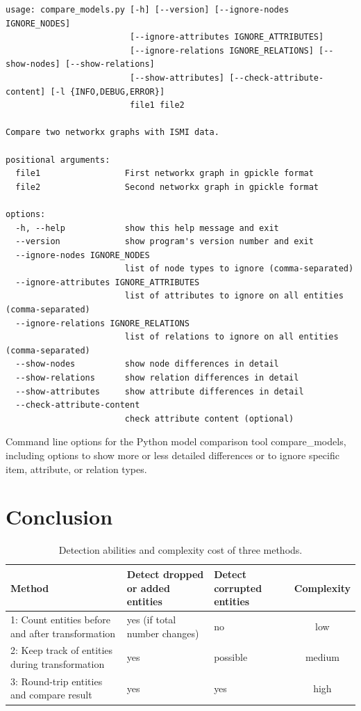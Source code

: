 \documentclass[final]{anthology-ch} %
\begin{document}
\begin{listing}
\begin{verbatim}
usage: compare_models.py [-h] [--version] [--ignore-nodes IGNORE_NODES]
                         [--ignore-attributes IGNORE_ATTRIBUTES]
                         [--ignore-relations IGNORE_RELATIONS] [--show-nodes] [--show-relations]
                         [--show-attributes] [--check-attribute-content] [-l {INFO,DEBUG,ERROR}]
                         file1 file2

Compare two networkx graphs with ISMI data.

positional arguments:
  file1                 First networkx graph in gpickle format
  file2                 Second networkx graph in gpickle format

options:
  -h, --help            show this help message and exit
  --version             show program's version number and exit
  --ignore-nodes IGNORE_NODES
                        list of node types to ignore (comma-separated)
  --ignore-attributes IGNORE_ATTRIBUTES
                        list of attributes to ignore on all entities (comma-separated)
  --ignore-relations IGNORE_RELATIONS
                        list of relations to ignore on all entities (comma-separated)
  --show-nodes          show node differences in detail
  --show-relations      show relation differences in detail
  --show-attributes     show attribute differences in detail
  --check-attribute-content
                        check attribute content (optional)
\end{verbatim}
  \caption{Command line options for the Python model comparison tool compare\_models, including options to show more or less detailed differences or to ignore specific item, attribute, or relation types.}
  \label{code:ismi-compare}
\end{listing}


\section{Conclusion}

\begin{table}[h]
  \centering
  \begin{tabular}{>{\raggedright}p{} >{\centering}p{} >{\centering}p{} c}
    Method & Detect dropped or added entities & Detect corrupted entities & Complexity \\ \midrule
    1: Count entities before and after transformation & yes (if total number changes) & no & low \\ \midrule
    2: Keep track of entities during transformation & yes & possible & medium \\ \midrule
    3: Round-trip entities and compare result & yes & yes & high \\ \bottomrule
  \end{tabular}
  \caption{Detection abilities and complexity cost of three methods.}
  \label{tab:method-abilities}
\end{table}
\end{document}

